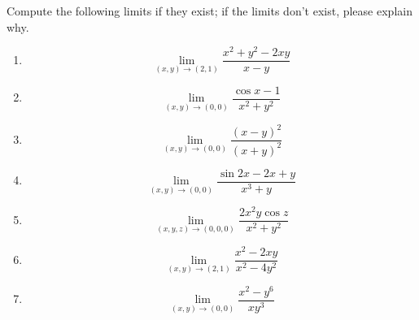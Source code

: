 \documentclass[openany]{book}
\begin{document}
\begin{prob}
    Compute the following limits if they exist; if the limits don't exist, please explain why.
    \begin{enumerate}
        \item \begin{equation*}
            \lim_{(x,y)\to(2,1)}\frac{x^2+y^2-2xy}{x-y}
        \end{equation*}
        \item \begin{equation*}
            \lim_{(x,y)\to(0,0)}\frac{\cos x-1}{x^2+y^2}
        \end{equation*}
        \item \begin{equation*}
            \lim_{(x,y)\to (0,0)}\frac{(x-y)^2}{(x+y)^2}
        \end{equation*}
        \item \begin{equation*}
            \lim_{(x,y)\to(0,0)}\frac{\sin 2x-2x+y}{x^3+y}
        \end{equation*}
        \item \begin{equation*}
            \lim_{(x,y,z)\to(0,0,0)}\frac{2x^2y\cos z}{x^2+y^2}
        \end{equation*}
        \item \begin{equation*}
            \lim_{(x,y)\to(2,1)}\frac{x^2-2xy}{x^2-4y^2}
        \end{equation*}
        \item \begin{equation*}
            \lim_{(x,y)\to(0,0)}\frac{x^2-y^6}{xy^3}
        \end{equation*}
    \end{enumerate}
\end{prob}
\newpage
\end{document}
